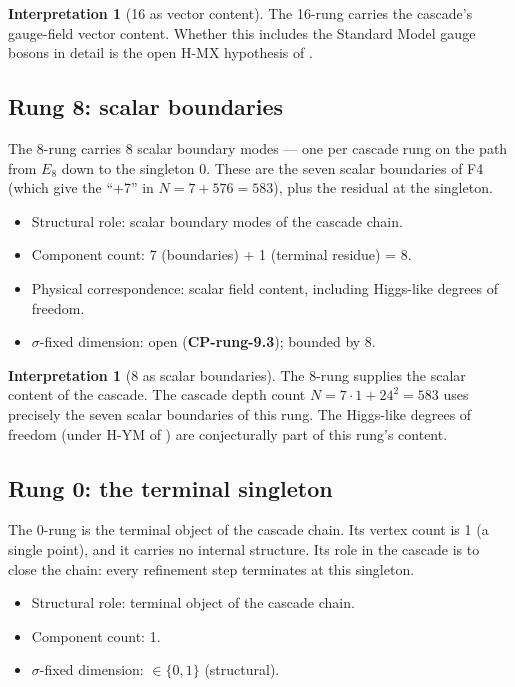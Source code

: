 \documentclass[11pt]{article}
\theoremstyle{plain}
\theoremstyle{definition}
\newtheorem{interpretation}[theorem]{Interpretation}
\theoremstyle{remark}
\begin{document}
\begin{interpretation}[16 as vector content]\label{int:rung-16}
The 16-rung carries the cascade's gauge-field vector content. Whether this includes the Standard Model gauge bosons in detail is the open H-MX hypothesis of \citet{SmartXXXVI}.
\end{interpretation}

\subsection{Rung 8: scalar boundaries}

The 8-rung carries 8 scalar boundary modes --- one per cascade rung on the path from $E_8$ down to the singleton 0. These are the seven scalar boundaries of F4 (which give the ``+7'' in $N = 7 + 576 = 583$), plus the residual at the singleton.

\begin{itemize}[leftmargin=2em]
\item Structural role: scalar boundary modes of the cascade chain.
\item Component count: 7 (boundaries) + 1 (terminal residue) = 8.
\item Physical correspondence: scalar field content, including Higgs-like degrees of freedom.
\item $\sigma$-fixed dimension: open (\textbf{CP-rung-9.3}); bounded by 8.
\end{itemize}

\begin{interpretation}[8 as scalar boundaries]\label{int:rung-8}
The 8-rung supplies the scalar content of the cascade. The cascade depth count $N = 7 \cdot 1 + 24^2 = 583$ uses precisely the seven scalar boundaries of this rung. The Higgs-like degrees of freedom (under H-YM of \citet{SmartXXXVI}) are conjecturally part of this rung's content.
\end{interpretation}

\subsection{Rung 0: the terminal singleton}

The 0-rung is the terminal object of the cascade chain. Its vertex count is 1 (a single point), and it carries no internal structure. Its role in the cascade is to close the chain: every refinement step terminates at this singleton.

\begin{itemize}[leftmargin=2em]
\item Structural role: terminal object of the cascade chain.
\item Component count: 1.
\item $\sigma$-fixed dimension: $\in \{0, 1\}$ (structural).
\end{itemize}
\end{document}
